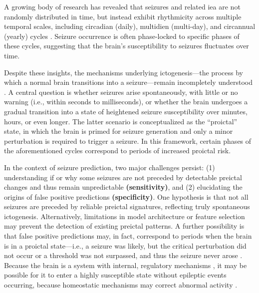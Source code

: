 A growing body of research has revealed that seizures and related \gls{iea} are not randomly distributed in time, but instead exhibit rhythmicity across multiple temporal scales, including circadian (daily), multidien (multi-day), and circannual (yearly) cycles \parencite{karoly_cycles_2021}.
Seizure occurrence is often phase-locked to specific phases of these cycles, suggesting that the brain's susceptibility to seizures fluctuates over time.

Despite these insights, the mechanisms underlying ictogenesis---the process by which a normal brain transitions into a seizure---remain incompletely understood \parencite{kuhlmann_seizure_2018}.
A central question is whether seizures arise spontaneously, with little or no warning (i.e., within seconds to milliseconds), or whether the brain undergoes a gradual transition into a state of heightened seizure susceptibility over minutes, hours, or even longer.
The latter scenario is conceptualized as the \enquote{proictal} state, in which the brain is primed for seizure generation and only a minor perturbation is required to trigger a seizure.
In this framework, certain phases of the aforementioned cycles correspond to periods of increased proictal risk.

In the context of seizure prediction, two major challenges persist: (1) understanding if or why some seizures are not preceded by detectable preictal changes and thus remain unpredictable \textbf{(sensitivity)}, and (2) elucidating the origins of false positive predictions \textbf{(specificity)}.
One hypothesis is that not all seizures are preceded by reliable preictal signatures, reflecting truly spontaneous ictogenesis.
Alternatively, limitations in model architecture or feature selection may prevent the detection of existing preictal patterns.
A further possibility is that false positive predictions may, in fact, correspond to periods when the brain is in a proictal state---i.e., a seizure was likely, but the critical perturbation did not occur or a threshold was not surpassed, and thus the seizure never arose \parencite{muller_coherent_2022}.
Because the brain is a system with internal, regulatory mechanisms \parencite{buzsaki_rhythms_2006}, it may be possible for it to enter a highly susceptible state without epileptic events occurring, because homeostatic mechanisms may correct abnormal activity \parencite{freestone_forward-looking_2017}.


